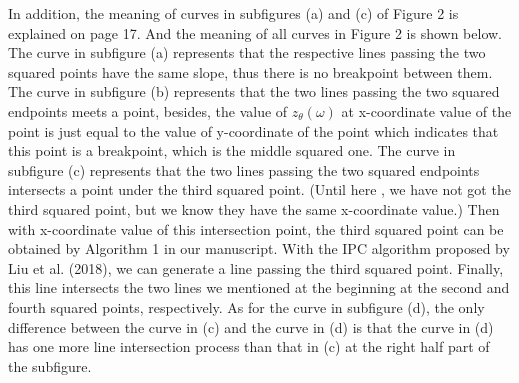 \documentclass[11pt]{article}
\begin{document}
In addition, the meaning of curves in subfigures (a) and (c) of Figure 2 is explained on page 17.
And the meaning of all curves in Figure 2 is shown below. The curve in subfigure (a) represents that the respective lines passing the two squared points have the same slope, thus there is no breakpoint between them.
The curve in subfigure (b) represents that the two lines passing the two squared endpoints meets a point, besides, the value of $z_\theta(\omega)$ at x-coordinate value of the point is just equal to the value of y-coordinate of the point which indicates that this point is a breakpoint, which is the middle squared one. The curve in subfigure (c) represents that the two lines passing the two squared endpoints intersects a point under the third squared point. (Until here , we have not got the third squared point, but we know they have the same x-coordinate value.) Then with x-coordinate value of this intersection point, the third squared point can be obtained by Algorithm 1 in our manuscript. With the IPC algorithm proposed by Liu et al. (2018), we can generate a line passing the third squared point. Finally, this line intersects the two lines we mentioned at the beginning at the second and fourth squared points, respectively.
As for the curve in subfigure (d), the only difference between the curve in (c) and the curve in (d) is that the curve in (d) has one more line intersection process than that in (c) at the right half part of the subfigure.
~\\[4mm]

~\\[2mm]
\end{document}
